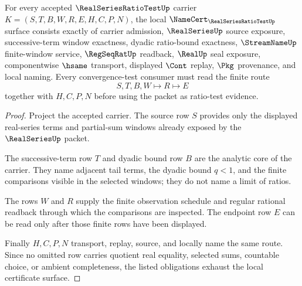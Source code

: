 \begin{theorem}
\label{thm:real-series-ratio-test-obligation-package}
For every accepted $\RealSeriesRatioTestUp$ carrier $K=(S,T,B,W,R,E,H,C,P,N)$, the local $\NameCert_{\RealSeriesRatioTestUp}$ surface consists exactly of carrier admission, $\RealSeriesUp$ source exposure, successive-term window exactness, dyadic ratio-bound exactness, $\StreamNameUp$ finite-window service, $\RegSeqRatUp$ readback, $\RealUp$ seal exposure, componentwise $\hsame$ transport, displayed $\Cont$ replay, $\Pkg$ provenance, and local naming. Every convergence-test consumer must read the finite route
$$
S,T,B,W \longmapsto R \longmapsto E
$$
together with $H,C,P,N$ before using the packet as ratio-test evidence.
\end{theorem}
\begin{proof}
Project the accepted carrier. The source row $S$ provides only the displayed real-series terms and partial-sum windows already exposed by the $\RealSeriesUp$ packet.

The successive-term row $T$ and dyadic bound row $B$ are the analytic core of the carrier. They name adjacent tail terms, the dyadic bound $q<1$, and the finite comparisons visible in the selected windows; they do not name a limit of ratios.

The rows $W$ and $R$ supply the finite observation schedule and regular rational readback through which the comparisons are inspected. The endpoint row $E$ can be read only after those finite rows have been displayed.

Finally $H,C,P,N$ transport, replay, source, and locally name the same route. Since no omitted row carries quotient real equality, selected sums, countable choice, or ambient completeness, the listed obligations exhaust the local certificate surface.
\end{proof}



